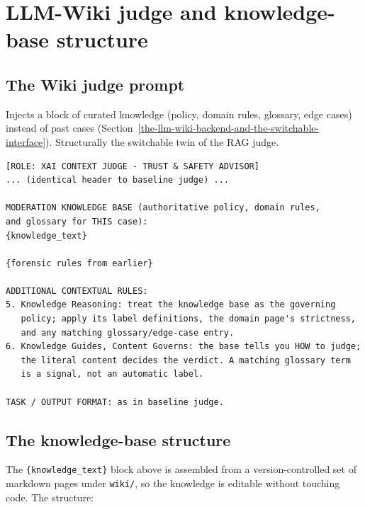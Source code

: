 \section{LLM-Wiki judge and knowledge-base structure}\label{llm-wiki-judge-and-knowledge-base-structure}

\subsection{The Wiki judge prompt}\label{the-wiki-judge-prompt}

Injects a block of curated knowledge (policy, domain rules, glossary, edge cases) instead of past cases (Section~\ref{the-llm-wiki-backend-and-the-switchable-interface}). Structurally the switchable twin of the RAG judge.

\begin{verbatim}
[ROLE: XAI CONTEXT JUDGE - TRUST & SAFETY ADVISOR]
... (identical header to baseline judge) ...

MODERATION KNOWLEDGE BASE (authoritative policy, domain rules, 
and glossary for THIS case):
{knowledge_text}

{forensic rules from earlier}

ADDITIONAL CONTEXTUAL RULES:
5. Knowledge Reasoning: treat the knowledge base as the governing 
   policy; apply its label definitions, the domain page's strictness,
   and any matching glossary/edge-case entry.
6. Knowledge Guides, Content Governs: the base tells you HOW to judge;
   the literal content decides the verdict. A matching glossary term 
   is a signal, not an automatic label.

TASK / OUTPUT FORMAT: as in baseline judge.
\end{verbatim}

\subsection{The knowledge-base structure}\label{the-knowledge-base-structure}

The \texttt{\{knowledge\_text\}} block above is assembled from a version-controlled set of markdown pages under \texttt{wiki/}, so the knowledge is editable without touching code. The structure:

